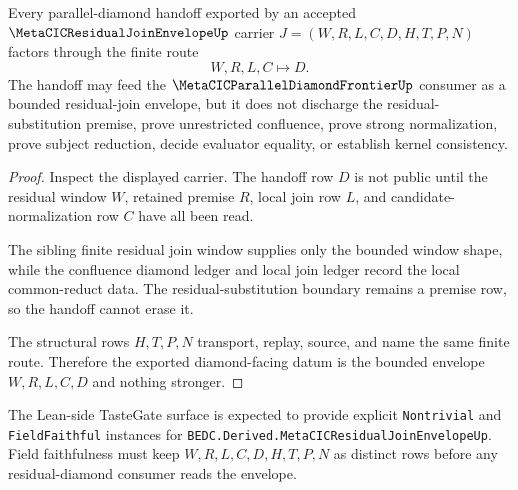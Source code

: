 \begin{theorem}
\label{thm:metacic-residual-join-envelope-diamond-handoff}
Every parallel-diamond handoff exported by an accepted $\MetaCICResidualJoinEnvelopeUp$ carrier $J=(W,R,L,C,D,H,T,P,N)$ factors through the finite route
$$
W,R,L,C \longmapsto D .
$$
The handoff may feed the $\MetaCICParallelDiamondFrontierUp$ consumer as a bounded residual-join envelope, but it does not discharge the residual-substitution premise, prove unrestricted confluence, prove strong normalization, prove subject reduction, decide evaluator equality, or establish kernel consistency.
\end{theorem}
\begin{proof}
Inspect the displayed carrier. The handoff row $D$ is not public until the residual window $W$, retained premise $R$, local join row $L$, and candidate-normalization row $C$ have all been read.

The sibling finite residual join window supplies only the bounded window shape, while the confluence diamond ledger and local join ledger record the local common-reduct data. The residual-substitution boundary remains a premise row, so the handoff cannot erase it.

The structural rows $H,T,P,N$ transport, replay, source, and name the same finite route. Therefore the exported diamond-facing datum is the bounded envelope $W,R,L,C,D$ and nothing stronger.
\end{proof}



The Lean-side TasteGate surface is expected to provide explicit \texttt{Nontrivial} and \texttt{FieldFaithful} instances for \texttt{BEDC.Derived.MetaCICResidualJoinEnvelopeUp}. Field faithfulness must keep $W,R,L,C,D,H,T,P,N$ as distinct rows before any residual-diamond consumer reads the envelope.


